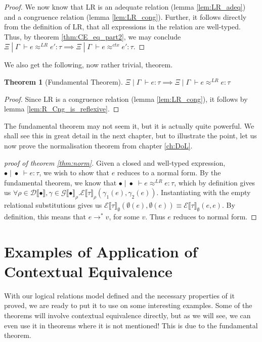 \documentclass[a4paper, 11pt]{report}
\newtheorem{theorem}{Theorem}
\theoremstyle{definition}
\newcommand{\expr}{e}
\newcommand{\val}{v}
\newcommand{\typ}{\tau}
\newcommand{\venv}{\Gamma}
\newcommand{\tenv}{\Xi}
\newcommand{\emptenv}{\bullet}
\newcommand{\empvenv}{\bullet}
\newcommand{\jdg}[4]{#1 \; | \; #2 \; \vdash #3 : #4}
\newcommand{\jdgRel}[6]{#1 \; | \; #2 \; \vdash #3 \approx^{#4} #5 : #6}
\newcommand{\ctxRel}[5]{\jdgRel{#1}{#2}{#3}{ctx}{#4}{#5}}
\newcommand{\stepS}{\rightarrow^*}
\newcommand{\ExpInp}[2]{\mathcal{E} \llbracket #1 \rrbracket_{#2}}
\newcommand{\VenvInp}[2]{\mathcal{G} \llbracket #1 \rrbracket_{#2}}
\newcommand{\TenvInp}[1]{\mathcal{D} \llbracket #1 \rrbracket}
\newcommand{\LogRel}[5]{\jdgRel{#1}{#2}{#3}{LR}{#4}{#5}}
\begin{document}
\begin{proof}
  We now know that LR is an adequate relation (lemma \ref{lem:LR_adeq}) and a congruence relation (lemma \ref{lem:LR_cong}). Further, it follows directly from the definition of LR, that all expressions in the relation are well-typed. Thus, by theorem \ref{thm:CE_eq_part2}, we may conclude $\LogRel{\tenv}{\venv}{\expr}{\expr'}{\typ} \implies \ctxRel{\tenv}{\venv}{\expr}{\expr'}{\typ}$.
\end{proof}
We also get the following, now rather trivial, theorem.
\begin{theorem}[Fundamental Theorem]\label{thm:fund}
  $\jdg{\tenv}{\venv}{\expr}{\typ} \implies \LogRel{\tenv}{\venv}{\expr}{\expr}{\typ}$
\end{theorem}
\begin{proof}
  Since LR is a congruence relation (lemma \ref{lem:LR_cong}), it follows by lemma \ref{lem:R_Cng_is_reflexive}.
\end{proof}
The fundamental theorem may not seem it, but it is actually quite powerful. We shall see this in great detail in the next chapter, but to illustrate the point, let us now prove the normalisation theorem from chapter \ref{ch:DoL}.
\begin{proof}[proof of theorem \ref{thm:norm}]
  Given a closed and well-typed expression, $\jdg{\emptenv}{\empvenv}{\expr}{\typ}$, we wish to show that $\expr$ reduces to a normal form. By the fundamental theorem, we know that $\LogRel{\emptenv}{\empvenv}{\expr}{\expr}{\typ}$, which by definition gives us $\forall \rho \in \TenvInp{\emptenv}, \gamma \in \VenvInp{\empvenv}{\rho} . \ExpInp{\typ}{\rho}(\gamma_1(\expr), \gamma_2(\expr))$. Instantiating with the empty relational substitutions gives us $\ExpInp{\typ}{\emptyset}(\emptyset(\expr), \emptyset(\expr)) \equiv \ExpInp{\typ}{\emptyset}(\expr, \expr)$. By definition, this means that $\expr \stepS \val$, for some $\val$. Thus $\expr$ reduces to normal form.
\end{proof}


\chapter{Examples of Application of Contextual Equivalence}
\label{ch:ACE}

With our logical relations model defined and the necessary properties of it proved, we are ready to put it to use on some interesting examples. Some of the theorems will involve contextual equivalence directly, but as we will see, we can even use it in theorems where it is not mentioned! This is due to the fundamental theorem.
\end{document}
